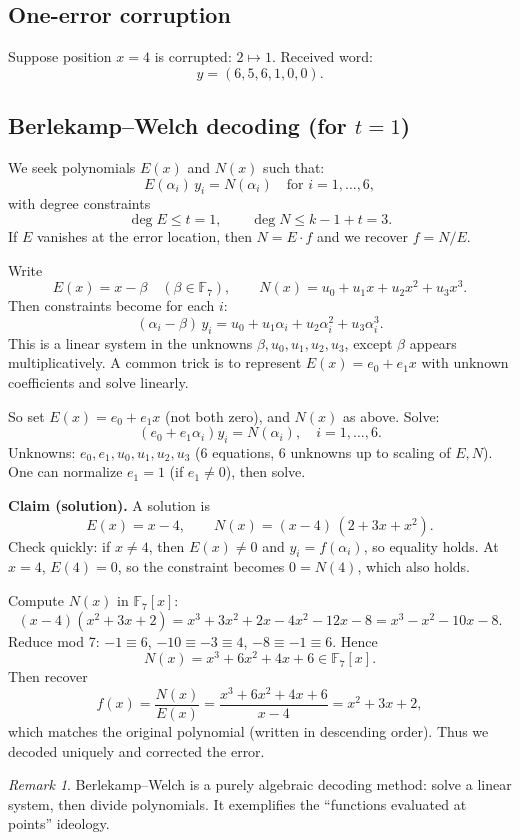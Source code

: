\documentclass[11pt]{article}
\theoremstyle{definition}
\theoremstyle{remark}
\newtheorem{remark}[theorem]{Remark}
\newcommand{\F}{\mathbb{F}}
\begin{document}
	\subsection{One-error corruption}
	Suppose position \(x=4\) is corrupted: \(2\mapsto 1\).
	Received word:
	\[
	y=(6,5,6,1,0,0).
	\]
	
	\subsection{Berlekamp--Welch decoding (for \(t=1\))}
	We seek polynomials \(E(x)\) and \(N(x)\) such that:
	\[
	E(\alpha_i)\,y_i = N(\alpha_i)\quad \text{for }i=1,\dots,6,
	\]
	with degree constraints
	\[
	\deg E \le t=1,\qquad \deg N \le k-1+t = 3.
	\]
	If \(E\) vanishes at the error location, then \(N=E\cdot f\) and we recover \(f=N/E\).
	
	Write
	\[
	E(x)=x-\beta \quad (\beta \in \F_7),\qquad N(x)=u_0+u_1x+u_2x^2+u_3x^3.
	\]
	Then constraints become for each \(i\):
	\[
	(\alpha_i-\beta)\,y_i = u_0+u_1\alpha_i+u_2\alpha_i^2+u_3\alpha_i^3.
	\]
	This is a linear system in the unknowns \(\beta,u_0,u_1,u_2,u_3\), except \(\beta\) appears multiplicatively.
	A common trick is to represent \(E(x)=e_0+e_1x\) with unknown coefficients and solve linearly.
	
	So set \(E(x)=e_0+e_1x\) (not both zero), and \(N(x)\) as above. Solve:
	\[
	(e_0+e_1\alpha_i)y_i = N(\alpha_i),\quad i=1,\dots,6.
	\]
	Unknowns: \(e_0,e_1,u_0,u_1,u_2,u_3\) (6 equations, 6 unknowns up to scaling of \(E,N\)).
	One can normalize \(e_1=1\) (if \(e_1\neq 0\)), then solve.
	
	\medskip
	\noindent\textbf{Claim (solution).} A solution is
	\[
	E(x)=x-4,\qquad N(x)=(x-4)\,(2+3x+x^2).
	\]
	Check quickly: if \(x\neq 4\), then \(E(x)\neq 0\) and \(y_i=f(\alpha_i)\), so equality holds.
	At \(x=4\), \(E(4)=0\), so the constraint becomes \(0=N(4)\), which also holds.
	
	Compute \(N(x)\) in \(\F_7[x]\):
	\[
	(x-4)(x^2+3x+2)=x^3+3x^2+2x-4x^2-12x-8
	= x^3 -x^2 -10x -8.
	\]
	Reduce mod 7:
	\(-1\equiv 6\), \(-10\equiv -3\equiv 4\), \(-8\equiv -1\equiv 6\). Hence
	\[
	N(x)=x^3+6x^2+4x+6 \in \F_7[x].
	\]
	Then recover
	\[
	f(x)=\frac{N(x)}{E(x)}= \frac{x^3+6x^2+4x+6}{x-4} = x^2+3x+2,
	\]
	which matches the original polynomial (written in descending order).
	Thus we decoded uniquely and corrected the error.
	
	\begin{remark}
		Berlekamp--Welch is a purely algebraic decoding method: solve a linear system, then divide polynomials.
		It exemplifies the ``functions evaluated at points'' ideology.
	\end{remark}
	
\end{document}
